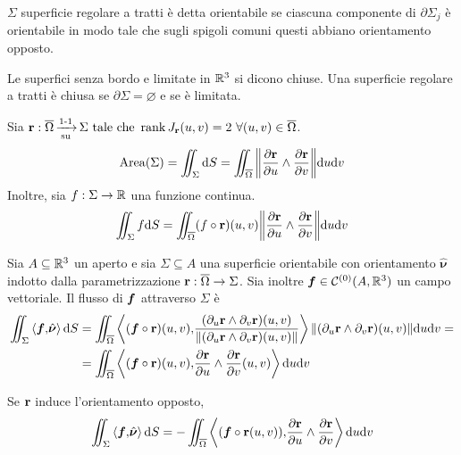 \begin{definition}
	$\Sigma$ superficie regolare a tratti è detta orientabile se ciascuna componente di $\partial \Sigma_j$ è orientabile in modo tale che sugli spigoli comuni questi abbiano orientamento opposto.
\end{definition}

\begin{definition}
	Le superfici senza bordo e limitate in $\mathbb{R}^3$ si dicono chiuse. Una superficie regolare a tratti è chiusa se $\partial \Sigma = \varnothing$ e se è limitata.
\end{definition}

\begin{definition}
	Sia $\vb{r}:\overline{\Omega} \operatorname{\xrightarrow[\operatorname{su}]{\operatorname{1-1}}} \Sigma \text{ tale che } \rank J_{\vb{r}}(u,v) = 2 \ \forall (u,v) \in \overline{\Omega}$.
	$$
		\operatorname{Area} (\Sigma) = \iint_\Sigma \dd S = \iint_{\overline{\Omega}} \norm{\frac{\partial \vb{r}}{\partial u}\wedge \frac{\partial \vb{r}}{\partial v}}\dd u \dd v
	$$
	Inoltre, sia $f: \Sigma \to \mathbb{R}$ una funzione continua.
	$$
		\iint_\Sigma f \dd S = \iint_{\overline{\Omega}}(f\circ\vb{r})(u,v)\norm{\frac{\partial \vb{r}}{\partial u}\wedge \frac{\partial \vb{r}}{\partial v}}\dd u \dd v
	$$
\end{definition}

\begin{definition}
	[Flusso]
	Sia $A\subseteq \mathbb{R}^3$ un aperto e sia $\Sigma \subseteq A$ una superficie orientabile con orientamento $\hat{\bm \nu}$ indotto dalla parametrizzazione $\vb{r}:\overline{\Omega}\to\Sigma$. Sia inoltre $\bm f \in \mathcal{C}^{(0)}(A,\mathbb{R}^3)$ un campo vettoriale. Il flusso di $\bm f$ attraverso $\Sigma$ è
	\begin{align*}
		\iint_\Sigma \left\langle\bm f{,}\hat{\bm\nu}\right\rangle\dd S 
		&=\iint_{\overline{\Omega}}\left\langle(\bm f\circ\vb{r})(u,v){,}\frac{(\partial_u\vb{r}\wedge\partial_v\vb{r})(u,v)}{\norm{(\partial_u\vb{r}\wedge\partial_v\vb{r})(u,v)}}\right\rangle\norm{(\partial_u\vb{r}\wedge\partial_v\vb{r})(u,v)}\dd u \dd v=\\
		&= \iint_{\overline{\Omega}}\left\langle(\bm f\circ\vb{r})(u,v){,}\frac{\partial \vb{r}}{\partial u} \wedge \frac{\partial \vb{r}}{\partial v}(u,v)\right\rangle\dd u \dd v\\
	\end{align*}
\end{definition}

\begin{remark}
	Se $\vb{r}$ induce l'orientamento opposto,
	$$
		\iint_\Sigma \left\langle\bm f{,}\hat{\bm\nu}\right\rangle\dd S = -\iint_{\overline{\Omega}}\left\langle(\bm f\circ\vb{r}(u,v)){,}\frac{\partial \vb{r}}{\partial u}\wedge \frac{\partial \vb{r}}{\partial v}\right\rangle\dd u \dd v
	$$
\end{remark}

